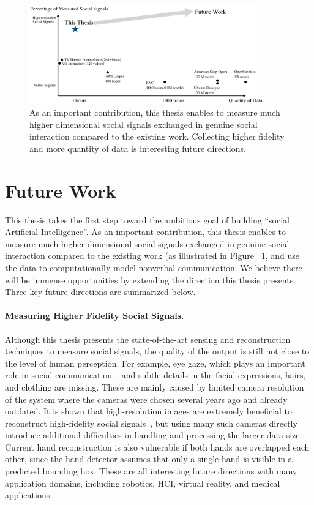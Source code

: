 \begin{figure}[t]	
	\includegraphics[width=0.9\textwidth]{figures/summary}
	\caption{As an important contribution, this thesis enables to measure much higher dimensional social signals exchanged in genuine social interaction compared to the existing work. Collecting higher fidelity and more quantity of data is interesting future directions.}
	\label{fig:summary}
\end{figure}

\section{Future Work}
This thesis takes the first step toward the ambitious goal of building ``social Artificial Intelligence''. As an important contribution, this thesis enables to measure much higher dimensional social signals exchanged in genuine social interaction compared to the existing work (as illustrated in Figure
~\ref{fig:summary}, and use the data to computationally model nonverbal communication. We believe there will be immense opportunities by extending the direction this thesis presents. Three key future directions are summarized below.

\paragraph{Measuring Higher Fidelity Social Signals.}
Although this thesis presents the state-of-the-art sensing and reconstruction techniques to measure social signals, the quality of the output is still not close to the level of human perception. For example, eye gaze, which plays an important role in social communication~\cite{rayner1998eye,friesen1998eyes,ricciardelli2002my}, and subtle details in the facial expressions, hairs, and clothing are missing. These are mainly caused by limited camera resolution of the system where the cameras were chosen several years ago and already outdated. It is shown that high-resolution images are extremely beneficial to reconstruct high-fidelity social signals~\cite{beeler2010high,Beeler2011}, but using many such cameras directly introduce additional difficulties in handling and processing the larger data size. Current hand reconstruction is also vulnerable if both hands are overlapped each other, since the hand detector assumes that only a single hand is visible in a predicted bounding box. These are all interesting future directions with many application domains, including robotics, HCI, virtual reality, and medical applications.

